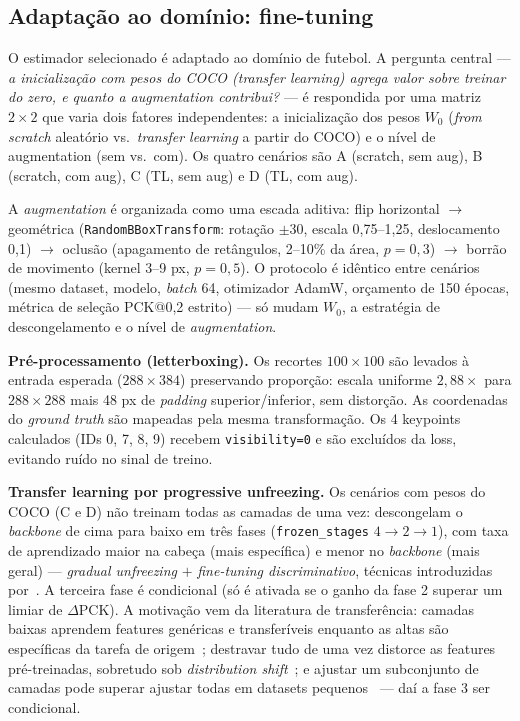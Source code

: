 \documentclass[12pt]{article}
\begin{document}
\subsection{Adaptação ao domínio: fine-tuning}

O estimador selecionado é adaptado ao domínio de futebol. A pergunta central --- \emph{a inicialização com pesos do COCO (transfer learning) agrega valor sobre treinar do zero, e quanto a augmentation contribui?} --- é respondida por uma matriz $2\times2$ que varia dois fatores independentes: a inicialização dos pesos $W_0$ (\emph{from scratch} aleatório vs.\ \emph{transfer learning} a partir do COCO) e o nível de augmentation (sem vs.\ com). Os quatro cenários são A (scratch, sem aug), B (scratch, com aug), C (TL, sem aug) e D (TL, com aug).

A \emph{augmentation} é organizada como uma escada aditiva: flip horizontal $\rightarrow$ geométrica (\texttt{RandomBBoxTransform}: rotação $\pm$30\textdegree, escala 0,75--1,25, deslocamento 0,1) $\rightarrow$ oclusão (apagamento de retângulos, 2--10\% da área, $p=0{,}3$) $\rightarrow$ borrão de movimento (kernel 3--9 px, $p=0{,}5$). O protocolo é idêntico entre cenários (mesmo dataset, modelo, \emph{batch} 64, otimizador AdamW, orçamento de 150 épocas, métrica de seleção PCK@0,2 estrito) --- só mudam $W_0$, a estratégia de descongelamento e o nível de \emph{augmentation}.

\textbf{Pré-processamento (letterboxing).} Os recortes $100\times100$ são levados à entrada esperada ($288\times384$) preservando proporção: escala uniforme $2{,}88\times$ para $288\times288$ mais 48 px de \emph{padding} superior/inferior, sem distorção. As coordenadas do \emph{ground truth} são mapeadas pela mesma transformação. Os 4 keypoints calculados (IDs 0, 7, 8, 9) recebem \texttt{visibility=0} e são excluídos da loss, evitando ruído no sinal de treino.

\textbf{Transfer learning por progressive unfreezing.} Os cenários com pesos do COCO (C e D) não treinam todas as camadas de uma vez: descongelam o \emph{backbone} de cima para baixo em três fases (\texttt{frozen\_stages} $4\rightarrow2\rightarrow1$), com taxa de aprendizado maior na cabeça (mais específica) e menor no \emph{backbone} (mais geral) --- \emph{gradual unfreezing} $+$ \emph{fine-tuning discriminativo}, técnicas introduzidas por~\cite{howard2018}. A terceira fase é condicional (só é ativada se o ganho da fase 2 superar um limiar de $\Delta$PCK). A motivação vem da literatura de transferência: camadas baixas aprendem features genéricas e transferíveis enquanto as altas são específicas da tarefa de origem~\cite{yosinski2014}; destravar tudo de uma vez distorce as features pré-treinadas, sobretudo sob \emph{distribution shift}~\cite{kumar2022}; e ajustar um subconjunto de camadas pode superar ajustar todas em datasets pequenos~\cite{lee2023} --- daí a fase 3 ser condicional.
\end{document}
